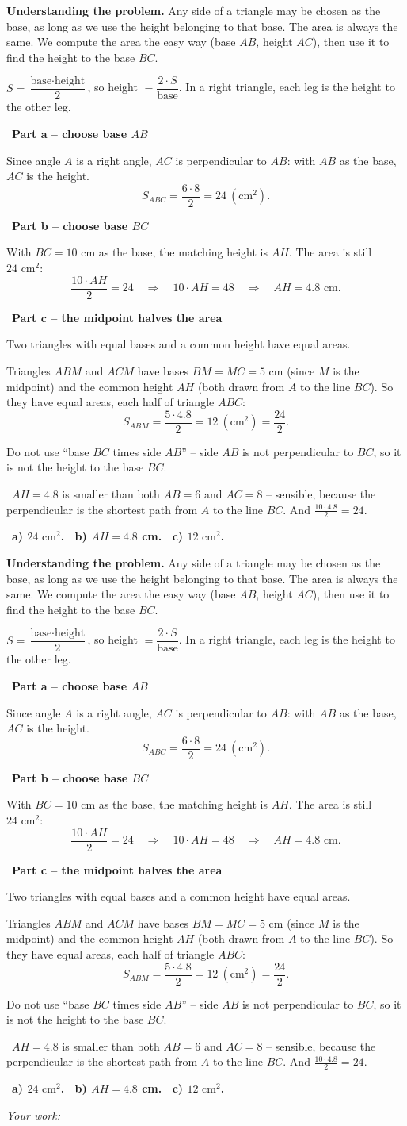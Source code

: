 \documentclass[11pt]{article}
\newif\ifsol \soltrue
\providecommand{\AnsWord}{Đáp số}
\newcommand{\ans}[1]{\par\smallskip{\bfseries\color{tmGreen!88!black}\AnsWord:}\ {\bfseries\color{AnsRed}#1}\par}
\newcommand{\probsol}[1]{%
  \begin{lrbox}{\solmeasure}\begin{minipage}{\dimexpr\linewidth-24pt\relax}#1\end{minipage}\end{lrbox}%
  \ifsol
    \begin{solbox}#1\end{solbox}%
  \else
    \setlength{\solht}{\dimexpr\ht\solmeasure+\dp\solmeasure+0.85cm\relax}%
    \ifdim\solht<1.35cm\setlength{\solht}{1.35cm}\fi
    \ifdim\solht>\StudentMaxWork\setlength{\solht}{\StudentMaxWork}\fi
    \begin{tcolorbox}[colback=white,colframe=Line,boxrule=0.8pt,arc=5pt,
      left=8pt,right=8pt,top=4pt,bottom=4pt,height=\solht]{\footnotesize\color{Slate}\itshape\WorkWord}\end{tcolorbox}%
  \fi}
\newlength{\StudentMaxWork}\setlength{\StudentMaxWork}{7.5cm}
\newcommand{\step}[2]{\par\smallskip\noindent{\bfseries\color{tmBlue!85!black}\StepWord~#1.}\ {\bfseries #2}\par\nopagebreak}
\newcommand{\verify}[1]{\par\smallskip\noindent{\bfseries\color{tmGreen!80!black}\faCheckCircle\ \CheckWord}\ #1\par}
\def\WorkWord{Your work:}
\def\AnsWord{Answer}
\def\StepWord{Step}
\def\CheckWord{Check:}
\begin{document}
\probsol{
\textbf{Understanding the problem.} Any side of a triangle may be chosen as the base, as long as we use the height belonging to that base. The area is always the same. We compute the area the easy way (base $AB$, height $AC$), then use it to find the height to the base $BC$.
\begin{recallbox}$S=\dfrac{\text{base}\cdot\text{height}}{2}$, so height $=\dfrac{2\cdot S}{\text{base}}$. In a right triangle, each leg is the height to the other leg.\end{recallbox}
\step{1}{Part a -- choose base $AB$}
Since angle $A$ is a right angle, $AC$ is perpendicular to $AB$: with $AB$ as the base, $AC$ is the height.
\[ S_{ABC}=\frac{6\cdot8}{2}=24\ (\text{cm}^2). \]

\step{2}{Part b -- choose base $BC$}
With $BC=10$ cm as the base, the matching height is $AH$. The area is still $24\text{ cm}^2$:
\[ \frac{10\cdot AH}{2}=24\quad\Rightarrow\quad 10\cdot AH=48\quad\Rightarrow\quad AH=4.8\text{ cm}. \]

\step{3}{Part c -- the midpoint halves the area}
\begin{recallbox}Two triangles with equal bases and a common height have equal areas.\end{recallbox}
Triangles $ABM$ and $ACM$ have bases $BM=MC=5$ cm (since $M$ is the midpoint) and the common height $AH$ (both drawn from $A$ to the line $BC$). So they have equal areas, each half of triangle $ABC$:
\[ S_{ABM}=\frac{5\cdot4.8}{2}=12\ (\text{cm}^2)=\frac{24}{2}. \]
\begin{warnbox}Do not use ``base $BC$ times side $AB$'' -- side $AB$ is not perpendicular to $BC$, so it is not the height to the base $BC$.\end{warnbox}
\verify{$AH=4.8$ is smaller than both $AB=6$ and $AC=8$ -- sensible, because the perpendicular is the shortest path from $A$ to the line $BC$. And $\frac{10\cdot4.8}{2}=24$.}
\ans{a) $24\text{ cm}^2$. \ b) $AH=4.8$ cm. \ c) $12\text{ cm}^2$.}
}

\providecommand{\tbGrid}[4]{\begin{tikzpicture}[baseline=0.2cm,x=0.5cm,y=0.5cm]
  \draw[Ink,line width=0.7pt] (0,0) grid[step=1] (2,2);
  \node[font=\sffamily\bfseries,text=tmBlue!80!black,inner sep=0pt,#4] at (#1,#2) {#3};\end{tikzpicture}}
\providecommand{\tbG}[6]{\draw[Ink,line width=0.7pt] (#1,#2) grid[step=0.5] ++(1,1);
  \node[font=\sffamily\bfseries,text=tmBlue!80!black,inner sep=0pt,#6] at ({#1+#3},{#2+#4}) {#5};}
\end{document}
